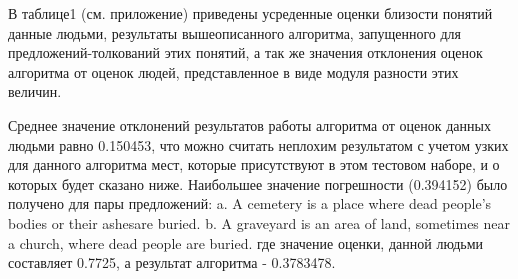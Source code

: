 В таблице1 (см. приложение) приведены усреденные оценки близости понятий данные людьми,
результаты вышеописанного алгоритма, запущенного для предложений-толкований этих понятий, 
а так же значения отклонения оценок алгоритма от оценок людей, 
представленное в виде модуля разности этих величин.

Среднее значение отклонений результатов работы алгоритма от оценок данных людьми равно 0.150453,
что можно считать неплохим результатом с учетом узких для данного алгоритма мест,
которые присутствуют в этом тестовом наборе, и о которых будет сказано ниже. 
Наибольшее значение погрешности (0.394152) было получено для пары предложений:
	a. A cemetery is a place where dead people's bodies or their ashesare buried.
	b. A graveyard is an area of land, sometimes near a church, where dead people are buried.
где значение оценки, данной людьми составляет 0.7725, а результат алгоритма - 0.3783478.
 


